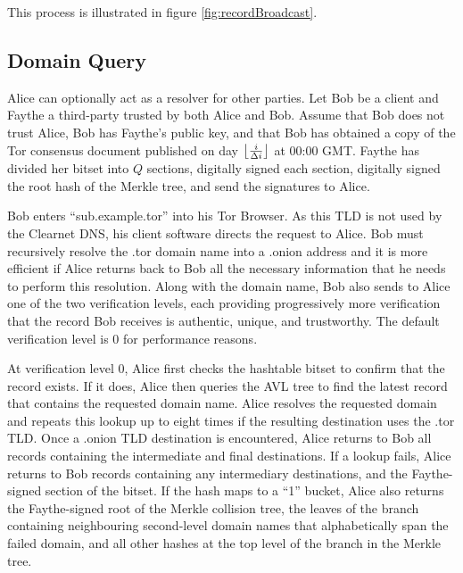 This process is illustrated in figure \ref{fig:recordBroadcast}.


\subsection{Domain Query}
\label{sec:DomainQuery}

Alice can optionally act as a resolver for other parties. Let Bob be a client and Faythe a third-party trusted by both Alice and Bob. Assume that Bob does not trust Alice, Bob has Faythe's public key, and that Bob has obtained a copy of the Tor consensus document published on day $ \floor[\big]{\frac{i}{\Delta i}} $ at 00:00 GMT. Faythe has divided her bitset into $ Q $ sections, digitally signed each section, digitally signed the root hash of the Merkle tree, and send the signatures to Alice.

Bob enters ``sub.example.tor'' into his Tor Browser. As this TLD is not used by the Clearnet DNS, his client software directs the request to Alice. Bob must recursively resolve the .tor domain name into a .onion address and it is more efficient if Alice returns back to Bob all the necessary information that he needs to perform this resolution. Along with the domain name, Bob also sends to Alice one of the two verification levels, each providing progressively more verification that the record Bob receives is authentic, unique, and trustworthy. The default verification level is 0 for performance reasons.

At verification level 0, Alice first checks the hashtable bitset to confirm that the record exists. If it does, Alice then queries the AVL tree to find the latest record that contains the requested domain name. Alice resolves the requested domain and repeats this lookup up to eight times if the resulting destination uses the .tor TLD. Once a .onion TLD destination is encountered, Alice returns to Bob all records containing the intermediate and final destinations. If a lookup fails, Alice returns to Bob records containing any intermediary destinations, and the Faythe-signed section of the bitset. If the hash maps to a ``1'' bucket, Alice also returns the Faythe-signed root of the Merkle collision tree, the leaves of the branch containing neighbouring second-level domain names that alphabetically span the failed domain, and all other hashes at the top level of the branch in the Merkle tree.

